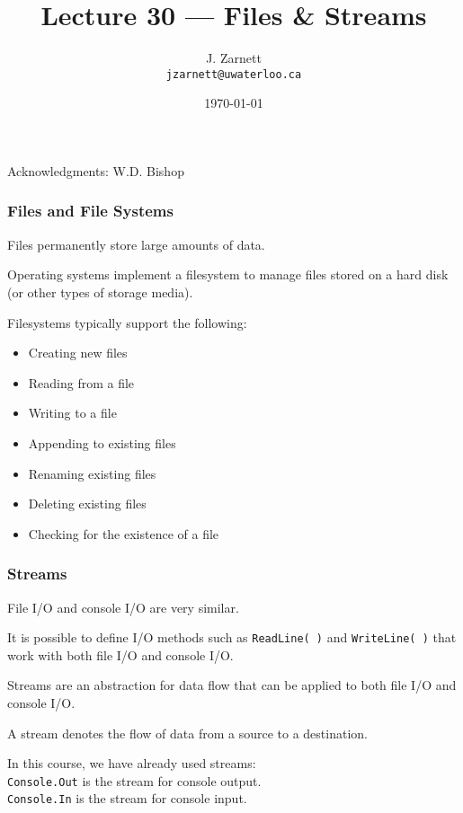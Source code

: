 

\title{Lecture 30 --- Files \& Streams }

\author{J. Zarnett\\
\texttt{jzarnett@uwaterloo.ca}}
\date{\today}



\begin{frame}
  \titlepage
  
  \begin{center}
  \small{Acknowledgments: W.D. Bishop}
  \end{center}
\end{frame}

\begin{frame}
\frametitle{Files and File Systems}

Files permanently store large amounts of data.

Operating systems implement a filesystem to manage files stored on a hard disk (or other types of storage media).

Filesystems typically support the following:
\begin{itemize}
\item Creating new files
\item Reading from a file
\item Writing to a file
\item Appending to existing files
\item Renaming existing files
\item Deleting existing files
\item Checking for the existence of a file
\end{itemize}

\end{frame}

\begin{frame}
\frametitle{Streams}

File I/O and console I/O are very similar.

It is possible to define I/O methods such as \texttt{ReadLine( )} and \texttt{WriteLine( )} that work with both file I/O and console I/O.

\alert{Stream}s are an abstraction for data flow that can be applied to both file I/O and console I/O.

A stream denotes the flow of data from a source to a destination.

In this course, we have already used streams:\\
\quad \texttt{Console.Out} is the stream for console output.\\
\quad \texttt{Console.In} is the stream for console input.


\end{frame}

